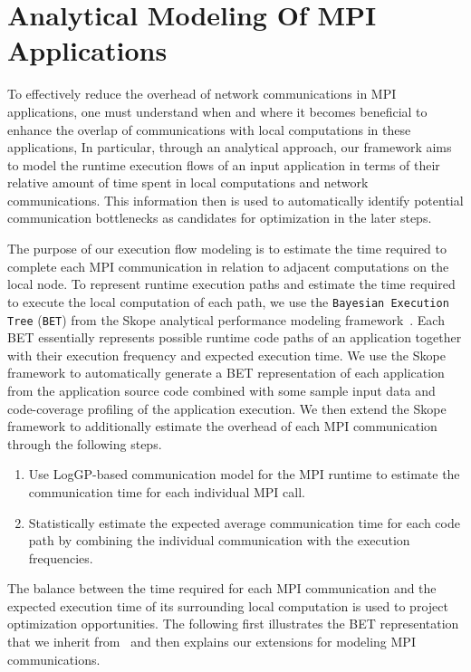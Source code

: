 \section{Analytical Modeling Of MPI Applications}
\label{sec-model}

To effectively reduce the overhead of network communications in MPI applications,
one must understand when and where it becomes beneficial to enhance the overlap of communications with local computations in these applications,
In particular, through an analytical approach, our framework aims to model the runtime execution flows of an input application in terms of their relative amount of time spent in local computations and network communications.
This information then is used to automatically identify potential communication bottlenecks as candidates for optimization in the later steps.

The purpose of our execution flow modeling is to estimate the time required to complete each MPI communication in relation to adjacent computations on the local node.
To represent runtime execution paths and estimate the time required to execute the local computation of each path, we use the  \texttt{Bayesian Execution Tree} (\texttt{BET})  from the Skope analytical performance modeling framework~\cite{jichi:ipdps14}.
Each BET essentially represents possible runtime code paths of an application together with their execution frequency and expected execution time. We use the Skope framework to automatically generate a BET representation of each application from the application source code combined with some sample input data and code-coverage  profiling of the application execution.
We then extend the Skope framework to additionally estimate the overhead of each MPI communication through the following steps.
\begin{enumerate}
\item Use LogGP-based communication model for the MPI runtime to estimate the communication time for each individual MPI call.
\item Statistically estimate the expected average communication time for each code path by combining the individual communication with the execution frequencies.
\end{enumerate}
The balance between the time required for each MPI communication and the expected execution time of its surrounding local computation is used to project optimization opportunities. The following first illustrates the BET representation that we inherit from~\cite{jichi:ipdps14} and then explains our extensions for modeling MPI communications.

